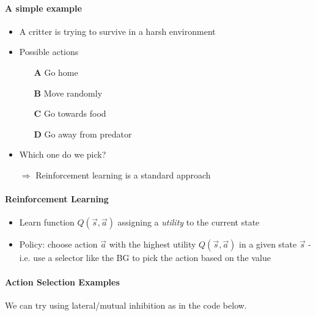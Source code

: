\documentclass[10pt,letterpaper,oneside]{article}
\begin{document}
\paragraph{A simple example}
\begin{itemize}
	\item A critter is trying to survive in a harsh environment
	\item Possible actions
	\begin{itemize}
		\item[\textbf{A}] Go home
		\item[\textbf{B}] Move randomly
		\item[\textbf{C}] Go towards food
		\item[\textbf{D}] Go away from predator
	\end{itemize}
	\item Which one do we pick?
	\item[$\Rightarrow$] Reinforcement learning is a standard approach
\end{itemize}

\paragraph{Reinforcement Learning}
\begin{itemize}
	\item Learn function $Q(\vec s, \vec a)$ assigning a \emph{utility} to the current state
	\item Policy: choose action $\vec a$ with the highest utility $Q(\vec s, \vec a)$ in a given state $\vec s$ - i.e. use a selector like the BG to pick the action based on the value
\end{itemize}

\paragraph{Action Selection Examples}

We can try using lateral/mutual inhibition as in the code below.
\end{document}
